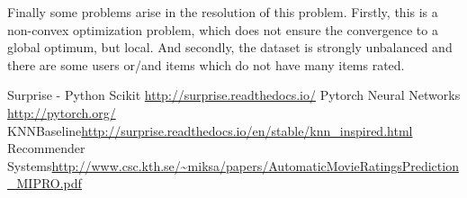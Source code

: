 \documentclass[11pt,conference]{IEEEtran}
\begin{document}
Finally some problems arise in the resolution of this problem. Firstly, this is a non-convex optimization problem, which does not ensure the convergence to a global optimum, but local. And secondly, the dataset is strongly unbalanced and there are some users or/and items which do not have many items rated.

\begin{thebibliography}{9}
Surprise - Python Scikit \url{http://surprise.readthedocs.io/}
Pytorch Neural Networks \url{http://pytorch.org/}
KNNBaseline\url{http://surprise.readthedocs.io/en/stable/knn_inspired.html}
Recommender Systems\url{http://www.csc.kth.se/~miksa/papers/AutomaticMovieRatingsPrediction_MIPRO.pdf}
\end{thebibliography}
\end{document}
